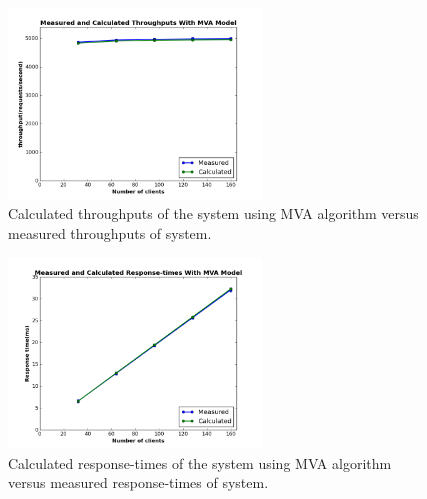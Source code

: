 \documentclass[11pt]{article}
\begin{document}
\begin{figure}[H]
  \includegraphics[width=0.6\textwidth,page=1]{figures/mva/throughput}
  \centering
  \caption{Calculated throughputs of the system using MVA algorithm \cite[section~34.2]{book} 
  versus measured throughputs of system.}
  \label{fig:mva-thr}
\end{figure}

\begin{figure}[H]
  \includegraphics[width=0.6\textwidth,page=1]{figures/mva/response-time}
  \centering
  \caption{Calculated response-times of the system using MVA algorithm \cite[section~34.2]{book} 
  versus measured response-times of system.}
  \label{fig:mva-resp}
\end{figure}
\end{document}
